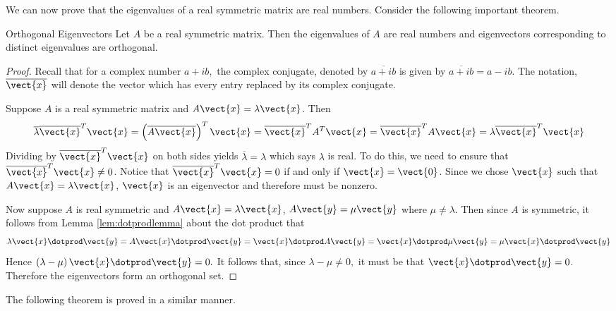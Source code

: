 We can now prove that the eigenvalues of a real symmetric matrix are real numbers.  Consider the following important theorem. 

\begin{theorem}{Orthogonal Eigenvectors}\label{thm:symmetricorthogonaleigenvectors}
Let $A$ be a real symmetric matrix. Then the eigenvalues of $A$ are real numbers and eigenvectors corresponding to distinct eigenvalues are orthogonal. 
\end{theorem}

\begin{proof}
Recall that for a complex number $a+ib,$ the complex conjugate, denoted by $
\overline{a+ib}$ is given by $\overline{a+ib}=a-ib.$ The
notation, $\overline{\vect{x}}$ will denote the vector which has every
entry replaced by its complex conjugate.

Suppose $A$ is a real symmetric matrix and $A\vect{x}=\lambda \vect{x}$.
Then 
\begin{equation*}
\overline{\lambda }\overline{\vect{x}}^{T}\vect{x}=\left( \overline{A
\vect{x}}\right) ^{T}\vect{x}=\overline{\vect{x}}^{T}A^{T}\vect{x}=
\overline{\vect{x}}^{T}A\vect{x}=\lambda \overline{\vect{x}}^{T}
\vect{x}
\end{equation*}
Dividing by $\overline{\vect{x}}^{T}\vect{x}$ on both sides yields $
\overline{\lambda }=\lambda $ which says $\lambda $ is real. To do this, we need to ensure that $\overline{\vect{x}}^{T}\vect{x} \neq 0$. Notice that $\overline{\vect{x}}^{T}\vect{x} = 0$ if and only if $\vect{x} = \vect{0}$. Since we chose $\vect{x}$ such that $A\vect{x} = \lambda \vect{x}$, $\vect{x}$ is an eigenvector and therefore must be nonzero.  

Now suppose $A$ is real symmetric and $A\vect{x}=\lambda \vect{x}$, $A
\vect{y}=\mu \vect{y}$ where $\mu \neq \lambda$. Then since $A$
is symmetric, it follows from Lemma \ref{lem:dotprodlemma} about the dot product that 
\begin{equation*}
\lambda \vect{x}\dotprod \vect{y}=A\vect{x}\dotprod \vect{y}=\vect{x}\dotprod A\vect{y}=\vect{x}\dotprod \mu \vect{y}=\mu \vect{x}\dotprod \vect{y}
\end{equation*}
Hence $\left( \lambda -\mu \right) \vect{x}\dotprod \vect{y}=0.$ It follows that,
since $\lambda -\mu \neq 0,$ it must be that $\vect{x}\dotprod \vect{y}=0$. Therefore the eigenvectors form an orthogonal set. 
\end{proof}

The following theorem is proved in a similar manner.

